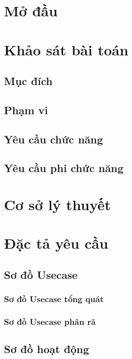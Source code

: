 \documentclass[12pt]{extreport}
\begin{document}
\tableofcontents

\newpage
\chapter*{Mở đầu}

\chapter{Khảo sát bài toán}
\section{Mục đích}
\section{Phạm vi}
\section{Yêu cầu chức năng}
\section{Yêu cầu phi chức năng}

\chapter{Cơ sở lý thuyết}

\chapter{Đặc tả yêu cầu}
\section{Sơ đồ Usecase}
\subsection{Sơ đồ Usecase tổng quát}
\subsection{Sơ đồ Usecase phân rã}
\section{Sơ đồ hoạt động}



\section{}
\end{document}
